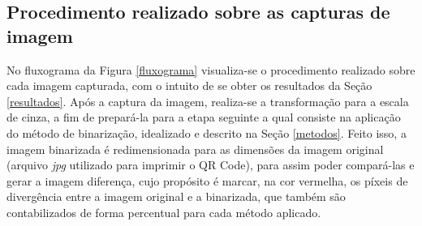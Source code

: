 \documentclass{ceel}
\begin{document}
\begin{multicols}{2}
\subsection{Procedimento realizado sobre as capturas de imagem}
No fluxograma da Figura \ref{fluxograma} visualiza-se o procedimento realizado sobre cada imagem capturada, com o intuito de se obter os resultados da Seção \ref{resultados}. Após a captura da imagem, realiza-se a transformação para a escala de cinza, a fim de prepará-la para a etapa seguinte a qual consiste na aplicação do método de binarização, idealizado e descrito na Seção \ref{metodos}. Feito isso, a imagem binarizada é redimensionada para as dimensões da imagem original (arquivo \emph{jpg} utilizado para imprimir o QR Code), para assim poder compará-las e gerar a imagem diferença, cujo propósito é marcar, na cor vermelha, os píxeis de divergência entre a imagem original e a binarizada, que também são contabilizados de forma percentual para cada método aplicado.


\end{multicols}
\end{document}
